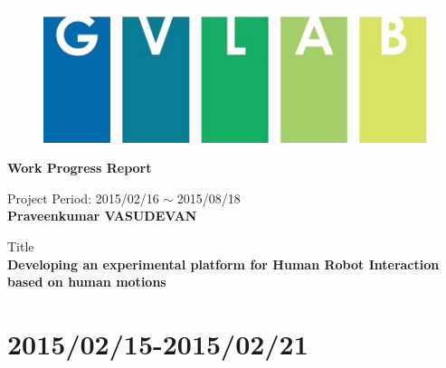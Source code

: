 \documentclass[11pt]{article} %
\title{\ttitle} %
\begin{document}
\renewcommand*{\arraystretch}{1.8}
\begin{titlepage}
\singlespacing
	\begin{center}
	\vspace*{1in}
	\begin{figure}
	\centering
	\includegraphics[scale=0.5]{logo.jpg}
	\end{figure}
	\vspace*{0.1in}
	\LARGE \textbf{Work Progress Report}
	
	\vspace{0.2in}
	\large Project Period: 2015/02/16 $\sim$ 2015/08/18 \\
	\vspace{0.5in}
	{\Large \textbf{Praveenkumar VASUDEVAN}}
	\par
	\vspace{0.1in}
	\vspace{0.3in}
	\large Title\\
	\vspace{0.1in}
	\Large \textbf{Developing an experimental platform for Human Robot Interaction based on human motions}
	\end{center}
\end{titlepage}


\section{2015/02/15-2015/02/21}
\end{document}

